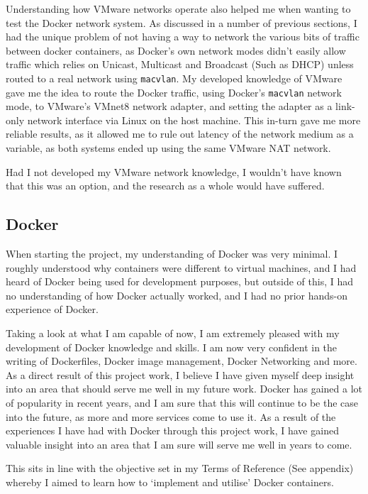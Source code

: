 Understanding how VMware networks operate also helped me when wanting to test the Docker network system. As discussed in a number of previous sections, I had the unique problem of not having a way to network the various bits of traffic between docker containers, as Docker's own network modes didn't easily allow traffic which relies on Unicast, Multicast and Broadcast (Such as DHCP) unless routed to a real network using \texttt{macvlan}. My developed knowledge of VMware gave me the idea to route the Docker traffic, using Docker's \texttt{macvlan} network mode, to VMware's VMnet8 network adapter, and setting the adapter as a link-only network interface via Linux on the host machine. This in-turn gave me more reliable results, as it allowed me to rule out latency of the network medium as a variable, as both systems ended up using the same VMware NAT network.

Had I not developed my VMware network knowledge, I wouldn't have known that this was an option, and the research as a whole would have suffered.

\subsection{Docker}%
When starting the project, my understanding of Docker was very minimal. I roughly understood why containers were different to virtual machines, and I had heard of Docker being used for development purposes, but outside of this, I had no understanding of how Docker actually worked, and I had no prior hands-on experience of Docker.

Taking a look at what I am capable of now, I am extremely pleased with my development of Docker knowledge and skills. I am now very confident in the writing of Dockerfiles, Docker image management, Docker Networking and more. As a direct result of this project work, I believe I have given myself deep insight into an area that should serve me well in my future work. Docker has gained a lot of popularity in recent years, and I am sure that this will continue to be the case into the future, as more and more services come to use it. As a result of the experiences I have had with Docker through this project work, I have gained valuable insight into an area that I am sure will serve me well in years to come.

This sits in line with the objective set in my Terms of Reference (See appendix) whereby I aimed to learn how to `implement and utilise' Docker containers.

